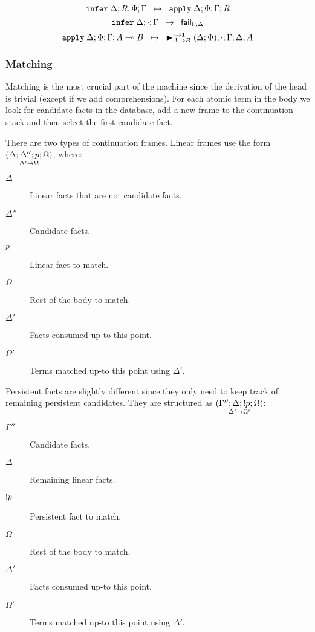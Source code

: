 \[
\trans{\dostate{\Delta}{R, \Phi}{\Gamma}}
   {\appstate{\Delta}{\Phi}{\Gamma}{R}}
\]
\[
\trans{\dostate{\Delta}{\cdot}{\Gamma}}
   {\failstate{\Gamma}{\Delta}}
\]
\[
\trans{\appstate{\Delta}{\Phi}{\Gamma}{A \lolli B}}
      {\matstate{A \lolli B}{(\Delta; \Phi)}{\cdot}{\Gamma}{\Delta}{A}{\cdot \rightarrow
                                                            \one}}
\]

\subsubsection{Matching}

Matching is the most crucial part of the machine since the derivation of the
head is trivial (except if we add comprehensions). For each atomic term in the
body we look for candidate facts in the database, add a new frame to the
continuation stack and then select the first candidate fact.

There are two types of continuation frames. Linear frames use the form
$\lframe{\Delta}{\Delta''}{p}{\Omega}{\Delta'}{\Omega}$, where:

\begin{description}
   \item[$\Delta$] Linear facts that are not candidate facts.
   \item[$\Delta''$] Candidate facts.
   \item[$p$] Linear fact to match.
   \item[$\Omega$] Rest of the body to match.
   \item[$\Delta'$] Facts consumed up-to this point.
   \item[$\Omega'$] Terms matched up-to this point using $\Delta'$.
\end{description}

Persistent facts are slightly different since they only need to keep track of
remaining persistent candidates. They are structured as $\pframe{\Gamma''}{\Delta}{\bang
   p}{\Omega}{\Delta'}{\Omega'}$:

\begin{description}
   \item[$\Gamma''$] Candidate facts.
   \item[$\Delta$] Remaining linear facts.
   \item[$\bang p$] Persistent fact to match.
   \item[$\Omega$] Rest of the body to match.
   \item[$\Delta'$] Facts consumed up-to this point.
   \item[$\Omega'$] Terms matched up-to this point using $\Delta'$.
\end{description}

